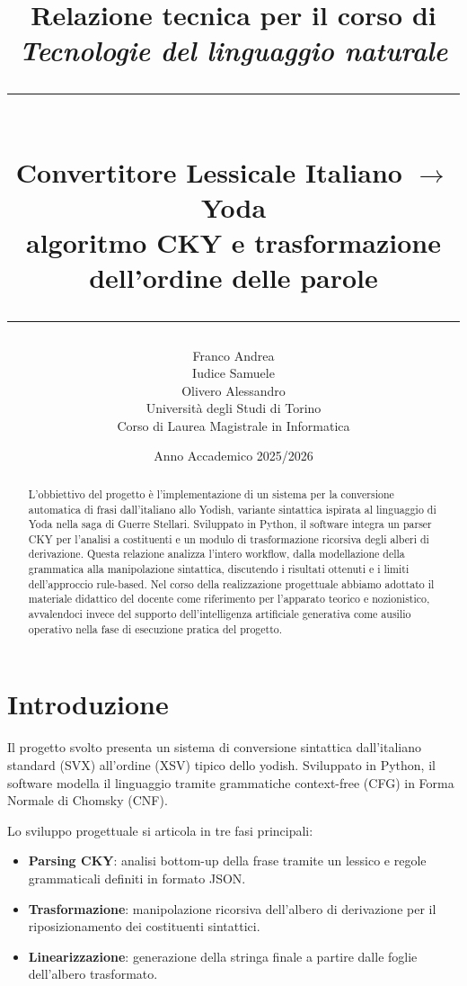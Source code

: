 \documentclass[12pt, a4paper]{article}
\title{
    \vspace{-1cm}
    {\large Relazione tecnica per il corso di}\\[0.3cm]
    {\large \textit{Tecnologie del linguaggio naturale}}\\[1cm]
    \rule{\linewidth}{1.5pt}\\[0.5cm]
    {\LARGE \textbf{Convertitore Lessicale Italiano $\rightarrow$ Yoda}}\\[0.3cm]
    {\large algoritmo CKY e trasformazione dell'ordine delle parole}\\[0.3cm]
    \rule{\linewidth}{1.5pt}
}
\author{
    \begin{tabular}[t]{c}
        Franco Andrea \\
        Iudice Samuele \\
        Olivero Alessandro \\[0.4cm]
        \small Università degli Studi di Torino \\
        \small Corso di Laurea Magistrale in Informatica
    \end{tabular}
}
\date{Anno Accademico 2025/2026}
\begin{document}
\maketitle
\thispagestyle{empty}
\vspace{1cm}

\begin{abstract}
\noindent
L'obbiettivo del progetto è l'implementazione di un sistema per la conversione automatica di frasi dall'italiano allo Yodish, variante sintattica ispirata al linguaggio di Yoda nella saga di Guerre Stellari. 
Sviluppato in Python, il software integra un parser CKY per l'analisi a costituenti e un modulo di trasformazione ricorsiva degli alberi di derivazione. Questa relazione analizza l'intero workflow, dalla 
modellazione della grammatica alla manipolazione sintattica, discutendo i risultati ottenuti e i limiti dell'approccio rule-based. 
Nel corso della realizzazione progettuale abbiamo adottato il materiale didattico del docente come riferimento per l'apparato teorico e nozionistico, avvalendoci invece del supporto dell'intelligenza artificiale generativa come ausilio operativo nella fase di esecuzione pratica del progetto.
\end{abstract}

\newpage
\tableofcontents
\newpage

\section{Introduzione}

Il progetto svolto presenta un sistema di conversione sintattica dall'italiano standard (SVX) all'ordine (XSV) tipico dello yodish. Sviluppato in Python, il software modella il linguaggio tramite grammatiche context-free (CFG) in Forma Normale di Chomsky (CNF).

Lo sviluppo progettuale si articola in tre fasi principali:
\begin{itemize}
    \item \textbf{Parsing CKY}: analisi bottom-up della frase tramite un lessico e regole grammaticali definiti in formato JSON.
    \item \textbf{Trasformazione}: manipolazione ricorsiva dell'albero di derivazione per il riposizionamento dei costituenti sintattici.
    \item \textbf{Linearizzazione}: generazione della stringa finale a partire dalle foglie dell'albero trasformato.
\end{itemize}
\end{document}
